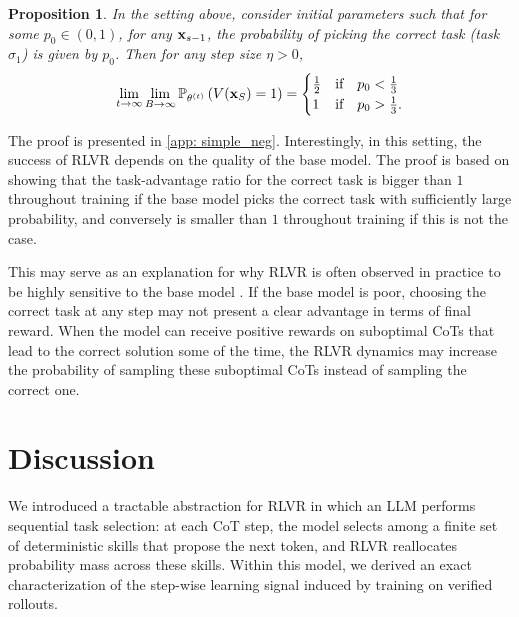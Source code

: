 \documentclass{article}
\theoremstyle{plain}
\newtheorem{proposition}[theorem]{Proposition}
\theoremstyle{definition}
\theoremstyle{remark}
\begin{document}
\begin{proposition}\label{prop: simple_neg}
    In the setting above, consider initial parameters such that for some $p_0\in(0,1)$, for any $\mathbf{x}_{s-1}$, the probability of picking the correct task (task $\sigma_1$) is given by $p_0$. Then for any step size $\eta > 0$,
    \begin{align*}
         \lim_{t \to\infty }\lim_{B\to \infty} \mathbb{P}_{\theta^{(t)}}\left(V(\mathbf{x}_S) = 1\right)
         = \begin{cases}
             \frac{1}{2} & \text{if } ~~ p_0 < \frac{1}{3} \\
             1 & \text{if } ~~ p_0 > \frac{1}{3}.
         \end{cases}
    \end{align*}

\end{proposition}

The proof is presented in \cref{app: simple_neg}.
Interestingly, in this setting, the success of RLVR depends on the quality of the base model. The proof is based on showing that the task-advantage ratio for the correct task is bigger than $1$ throughout training if the base model picks the correct task with sufficiently large probability, and conversely is smaller than $1$ throughout training if this is not the case. 

This may serve as an explanation for why RLVR is often observed in practice to be highly sensitive to the base model \citep{yue2025does}. If the base model is poor, choosing the correct task at any step may not present a clear advantage in terms of final reward. When the model can receive positive rewards on suboptimal CoTs that lead to the correct solution some of the time, the RLVR dynamics may increase the probability of sampling these suboptimal CoTs instead of sampling the correct one.

\section{Discussion}
We introduced a tractable abstraction for RLVR in which an LLM performs sequential task selection: at each CoT step, the model selects among a finite set of deterministic skills that propose the next token, and RLVR reallocates probability mass across these skills. Within this model, we derived an exact characterization of the step-wise learning signal induced by training on verified rollouts.
\end{document}
